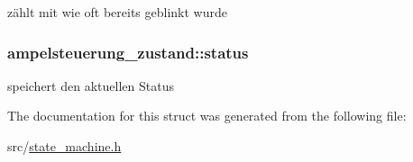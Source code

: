 zählt mit wie oft bereits geblinkt wurde 

\hypertarget{structampelsteuerung__zustand_a7f874ec6002fe3f3f6fcd33f83d402b6}{}
\subsubsection[{status}]{ ampelsteuerung\+\_\+zustand\+::status}\label{structampelsteuerung__zustand_a7f874ec6002fe3f3f6fcd33f83d402b6}


speichert den aktuellen Status 



The documentation for this struct was generated from the following file\+:\begin{DoxyCompactItemize}
\item 
src/\hyperlink{state__machine_8h}{state\+\_\+machine.\+h}\end{DoxyCompactItemize}
